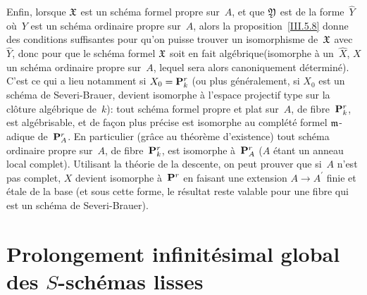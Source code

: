 Enfin, lorsque $\mathfrak{X}$ est un sch\'ema formel propre sur~$A$, et
que $\mathfrak{Y}$ est de la forme~$\widehat{Y}$ o\`u~$Y$ est un
sch\'ema ordinaire propre sur~$A$, alors la
proposition~\ref{III.5.8} donne des conditions suffisantes pour qu'on
puisse trouver un isomorphisme de~$\mathfrak{X}$ avec~$\widehat{Y}$, donc
pour que le sch\'ema formel $\mathfrak{X}$ soit en fait
\og alg\'ebrique\fg (\ie isomorphe \`a un~$\widehat{X}$, $X$ un
sch\'ema ordinaire propre sur~$A$, lequel sera alors canoniquement
d\'etermin\'e). C'est ce qui a lieu notamment si $X_0=\mathbf{P}_k^r$ (ou
plus g\'en\'eralement, si $X_0$ est un sch\'ema de
Severi-Brauer,
\ie devient
isomorphe \`a l'espace projectif type sur la cl\^oture
alg\'ebrique de~$k$): tout sch\'ema formel propre et plat sur~$A$,
de fibre~$\mathbf{P}_k^r$, est alg\'ebrisable, et de fa\c con plus
pr\'ecise est isomorphe au compl\'et\'e formel $\mathfrak{m}$-adique
de~$\mathbf{P}_A^r$. En particulier (gr\^ace au \og th\'eor\`eme
d'existence\fg) tout sch\'ema ordinaire propre sur~$A$, de
fibre~$\mathbf{P}_k^r$, est isomorphe \`a~$\mathbf{P}_A^r$ ($A$ \'etant un
anneau local complet). Utilisant la th\'eorie de la descente, on
peut prouver que si~$A$ n'est pas complet, $X$ devient isomorphe
\`a~$\mathbf{P}^r$ en faisant une extension $A\to A^\prime$ finie et
\'etale de la base (et sous cette forme, le r\'esultat reste
valable pour une fibre qui est un sch\'ema de
Severi-Brauer).

\section{Prolongement infinit\'esimal global des $S$-sch\'emas lisses}
\label{III.6}

